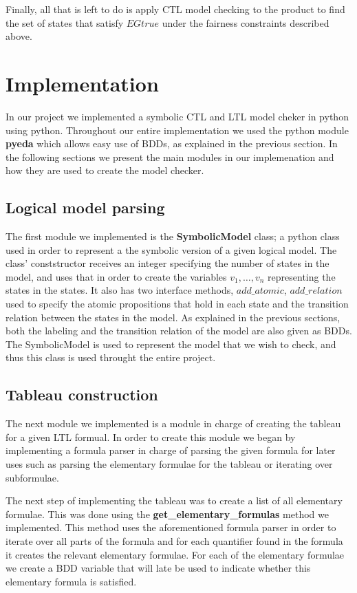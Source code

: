 \documentclass[11pt]{article}
\begin{document}
        Finally, all that is left to do is apply CTL model checking to the product
        to find the set of states that satisfy $EGtrue$ under the fairness
        constraints described above.

\section{Implementation}
    In our project we implemented a symbolic CTL and LTL model cheker in python 
    using python. Throughout our entire implementation we used the python module
    \textbf{pyeda} which allows easy use of BDDs, as explained in the previous section.
    In the following sections we present the main modules in our implemenation and how
    they are used to create the model checker.

    \subsection{Logical model parsing}
        The first module we implemented is the \textbf{SymbolicModel} class; 
        a python class used in order to represent a the symbolic version of 
        a given logical model.
        The class' conststructor receives an integer specifying the number of
        states in the model, and uses that in order to create the variables 
        $v_1, \dots, v_n$ representing the states in the states. It also
        has two interface methods, $add\_atomic$, $add\_relation$ used to
        specify the atomic propositions that hold in each state and the
        transition relation between the states in the model. As explained in
        the previous sections, both the labeling and the transition relation
        of the model are also given as BDDs.
        The SymbolicModel is used to represent the model that we wish to check,
        and thus this class is used throught the entire project.

    \subsection{Tableau construction}
        The next module we implemented is a module in charge of creating the
        tableau for a given LTL formual. In order to create this module we began
        by implementing a formula parser in charge of parsing the given formula 
        for later uses such as parsing the elementary formulae for the tableau or iterating
        over subformulae.

        The next step of implementing the tableau was to create a list of all
        elementary formulae. This was done using the \textbf{get\_elementary\_formulas}
        method we implemented. This method uses the aforementioned formula parser 
        in order to iterate over all parts of the formula and for each quantifier
        found in the formula it creates the relevant elementary formulae.
        For each of the elementary formulae we create a BDD variable that will
        late be used to indicate whether this elementary formula is satisfied.
\end{document}
